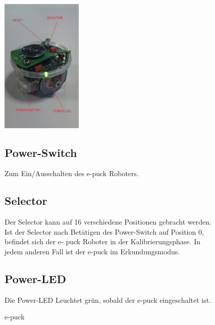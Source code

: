 \documentclass[10pt,a4paper]{article}
\begin{document}
 	\begin{figure}[htbp]
		\begin{minipage}[t]{6.5cm}
			\vspace{0pt}
			\includegraphics[height=6.5cm]{images/puck1.png} 
			\caption{e-puck}
		\end{minipage}
		\hfill
		\begin{minipage}[t]{0.5\textwidth}
			\vspace{5pt}
				\subsection{Power-Switch}
					Zum Ein/Ausschalten des e-puck Roboters.
				\subsection{Selector}
					Der Selector kann auf 16 verschiedene Positionen gebracht werden. Ist der Selector nach Bet\"atigen des Power-Switch auf Position 0, befindet sich der e-
					puck Roboter in der Kalibrierungsphase. In jedem anderen Fall ist der e-puck im Erkundungsmodus.
				\subsection{Power-LED}
					Die Power-LED Leuchtet gr\"un, sobald der e-puck eingeschaltet ist.
		\end{minipage}
   \end{figure}
   
\end{document}

